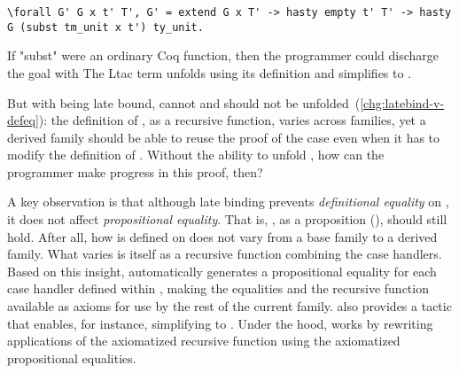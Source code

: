 \begin{centered}
\begin{minipage}{\textwidth}
\begin{lstlisting}[basicstyle=\fontsize{8.25}{9}\ttfamily]
\forall G' G x t' T', G' = extend G x T' -> hasty empty t' T' -> hasty G (subst tm_unit x t') ty_unit.
\end{lstlisting}
\end{minipage}
\end{centered}

\noindent
If "subst" were an ordinary Coq function, then the programmer could
discharge the goal with
The Ltac term  unfolds  using its definition
and simplifies  to .

But with  being late bound,  cannot and should not
be unfolded~(\ref{chg:latebind-v-defeq}):
the definition of , as a recursive function,
varies across families, yet a derived family should be able to reuse the
proof of the  case
even when it has to modify the definition of .
Without the ability to unfold ,
how can the programmer make progress in this proof, then?

A key observation is that although late binding
prevents \emph{definitional equality} on , it does not
affect \emph{propositional equality}.
That is, ,
as a proposition (), should still hold.
After all, how  is defined on  does not vary
from a base family to a derived family.
What varies is  itself as a recursive function combining the case handlers.
%
Based on this insight, \Lang automatically generates
a propositional equality for each case handler defined within ,
making the equalities and the recursive function available as axioms for use by the rest of the current family.
\Lang also provides a tactic  that enables, for instance,
simplifying  to .
Under the hood,  works by rewriting applications of the
axiomatized recursive function using the axiomatized propositional equalities.

